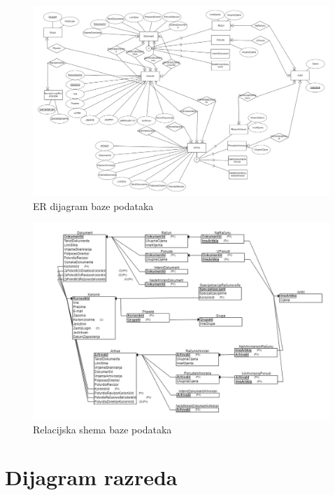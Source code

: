 			\begin{figure}[H]
				\includegraphics[width=\textwidth]{slike/ER_dijagram.png} %
				\caption{ER dijagram baze podataka}
				\label{fig:er_diagram} %
			\end{figure}

			\begin{figure}[H]
				\includegraphics[width=\textwidth]{slike/Relacijska_shema.png} %
				\caption{Relacijska shema baze podataka}
				\label{fig:relacijska_shema} %
			\end{figure}

			\eject
			
			
		\section{Dijagram razreda}
		
